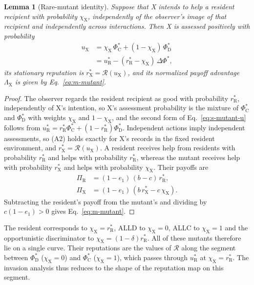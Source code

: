 \documentclass[10pt]{wlscirep}
\newcommand{\Rmap}{\mathscr{R}}            %
\newcommand{\rR}{r_{\mathrm{R}}^{*}}
\newcommand{\uR}{u_{\mathrm{R}}^{*}}
\newcommand{\rX}{r_{\mathrm{X}}^{*}}
\newcommand{\uX}{u_{\mathrm{X}}}
\newcommand{\PhiCs}{\Phi^{*}_{\mathrm{C}}}
\newcommand{\PhiDs}{\Phi^{*}_{\mathrm{D}}}
\newcommand{\dPhi}{\Delta\Phi^{*}}
\theoremstyle{plain}
\newtheorem{lemma}{Lemma}
\theoremstyle{remark}
\begin{document}
\begin{lemma}[Rare-mutant identity]\label{lem:mutant}
Suppose that X intends to help a resident recipient with probability $\chi_{\mathrm X}$, independently of the observer's image of that recipient and independently across interactions. Then X is assessed positively with probability
\begin{equation}
\begin{aligned}
\uX&=\chi_{\mathrm X}\,\PhiCs+(1-\chi_{\mathrm X})\,\PhiDs\\
&=\uR-(\rR-\chi_{\mathrm X})\,\dPhi,
\end{aligned}
\label{eq:s-mutant-u}
\end{equation}
its stationary reputation is $\rX=\Rmap(\uX)$, and its normalized payoff advantage $\Lambda_{\mathrm X}$ is given by Eq.~\eqref{eq:m-mutant}.
\end{lemma}
\begin{proof}
The observer regards the resident recipient as good with probability $\rR$, independently of X's intention, so X's assessment probability is the mixture of $\PhiCs$ and $\PhiDs$ with weights $\chi_{\mathrm X}$ and $1-\chi_{\mathrm X}$, and the second form of Eq.~\eqref{eq:s-mutant-u} follows from $\uR=\rR\PhiCs+(1-\rR)\PhiDs$. Independent actions imply independent assessments, so (A2) holds exactly for X's records in the fixed resident environment, and $\rX=\Rmap(\uX)$. A resident receives help from residents with probability $\rR$ and helps with probability $\rR$, whereas the mutant receives help with probability $\rX$ and helps with probability $\chi_{\mathrm X}$. Their payoffs are
\begin{equation}
\begin{aligned}
\Pi_{\mathrm R}&=(1-e_1)\,(b-c)\,\rR,\\
\Pi_{\mathrm X}&=(1-e_1)\,(b\,\rX-c\,\chi_{\mathrm X}).
\end{aligned}
\label{eq:s-mutant-payoffs}
\end{equation}
Subtracting the resident's payoff from the mutant's and dividing by $c(1-e_1)>0$ gives Eq.~\eqref{eq:m-mutant}.
\end{proof}

The resident corresponds to $\chi_{\mathrm X}=\rR$, ALLD to $\chi_{\mathrm X}=0$, ALLC to $\chi_{\mathrm X}=1$ and the opportunistic discriminator to $\chi_{\mathrm X}=(1-\delta)\rR$. All of these mutants therefore lie on a single curve. Their reputations are the values of $\Rmap$ along the segment between $\PhiDs$ ($\chi_{\mathrm X}=0$) and $\PhiCs$ ($\chi_{\mathrm X}=1$), which passes through $\uR$ at $\chi_{\mathrm X}=\rR$. The invasion analysis thus reduces to the shape of the reputation map on this segment.
\end{document}
